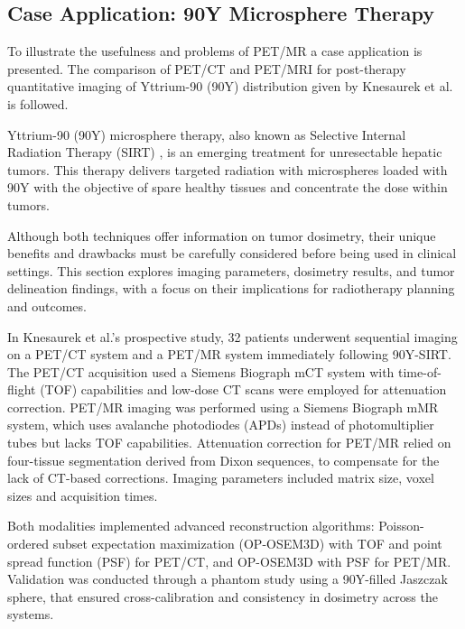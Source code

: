 \documentclass[11pt]{article} %
\begin{document}
\begin{multicols}{2}
\section{Case Application: 90Y Microsphere Therapy}
\label{sec:case}

To illustrate the usefulness and problems of PET/MR a case application is presented. The comparison of PET/CT and PET/MRI for post-therapy quantitative imaging of Yttrium-90 (90Y) distribution given by Knesaurek et al. \cite{knesaurek2018} is followed.

Yttrium-90 (90Y) microsphere therapy, also known as Selective Internal Radiation Therapy (SIRT) %
, is an emerging treatment for unresectable hepatic tumors. This therapy delivers targeted radiation with microspheres loaded with 90Y with the objective of spare healthy tissues and concentrate the dose within tumors.

Although both techniques offer information on tumor dosimetry, their unique benefits and drawbacks must be carefully considered before being used in clinical settings. This section explores imaging parameters, dosimetry results, and tumor delineation findings, with a focus on their implications for radiotherapy planning and outcomes.

In Knesaurek et al.’s prospective study, 32 patients underwent sequential imaging on a PET/CT system and a PET/MR system immediately following 90Y-SIRT. The PET/CT acquisition used a Siemens Biograph mCT system with time-of-flight (TOF) capabilities and low-dose CT scans were employed for attenuation correction. PET/MR imaging was performed using a Siemens Biograph mMR system, which uses avalanche photodiodes (APDs) instead of photomultiplier tubes but lacks TOF capabilities. 
Attenuation correction for PET/MR relied on four-tissue segmentation derived from Dixon sequences, %
to compensate for the lack of CT-based corrections. Imaging parameters included matrix size, voxel sizes and acquisition times. 


Both modalities implemented advanced reconstruction algorithms: Poisson-ordered subset expectation maximization (OP-OSEM3D) with TOF and point spread function (PSF) for PET/CT, and OP-OSEM3D with PSF for PET/MR. Validation was conducted through a phantom study using a 90Y-filled Jaszczak sphere, that ensured cross-calibration and consistency in dosimetry across the systems.


\end{multicols}
\end{document}
